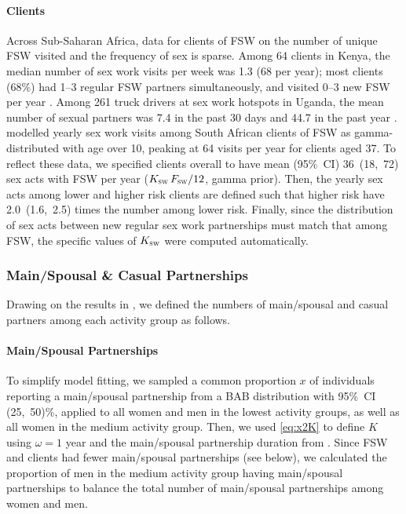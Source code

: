 \paragraph{Clients}
Across Sub-Saharan Africa, data for clients of FSW on
the number of unique FSW visited and the frequency of sex is sparse.
Among 64 clients in Kenya,
the median number of sex work visits per week was 1.3 (68 per year);
most clients (68\%) had 1--3 regular FSW partners simultaneously, and
visited 0--3 new FSW per year \cite{Voeten2002}.
Among 261 truck drivers at sex work hotspots in Uganda,
the mean number of sexual partners was
7.4 in the past 30 days and 44.7 in the past year \cite{Matovu2012}.
\citet{Johnson2017} modelled yearly sex work visits among South African clients of FSW as
gamma-distributed with age over 10, peaking at 64 visits per year for clients aged 37.
To reflect these data, we specified clients overall to have
mean (95\%~CI) 36~(18,~72) sex acts with FSW per year
($K_{\textsc{sw}}\,F_{\textsc{sw}}/12$, gamma prior).
Then, the yearly sex acts among lower and higher risk clients are defined such that
higher risk have 2.0~(1.6,~2.5) times the number among lower risk.
Finally, since the distribution of sex acts between new \vs regular sex work partnerships
must match that among FSW, the specific values of $K_{\textsc{sw}}$
were computed automatically.
\subsubsection{Main/Spousal \& Casual Partnerships}\label{mod.par.pnum.mcx}
Drawing on the results in ,
we defined the numbers of main/spousal and casual partners
among each activity group as follows.
\paragraph{Main/Spousal Partnerships}
To simplify model fitting, we sampled a common proportion $x$ of
individuals reporting a main/spousal partnership from a BAB distribution with 95\%~CI (25,~50)\%,
applied to all women and men in the lowest activity groups,
as well as all women in the medium activity group.
Then, we used \eqref{eq:x2K} to define $K$ using $\omega = 1$ year and
the main/spousal partnership duration from .
Since FSW and clients had fewer main/spousal partnerships (see below),
we calculated the proportion of men in the medium activity group having main/spousal partnerships
to balance the total number of main/spousal partnerships among women and men.
